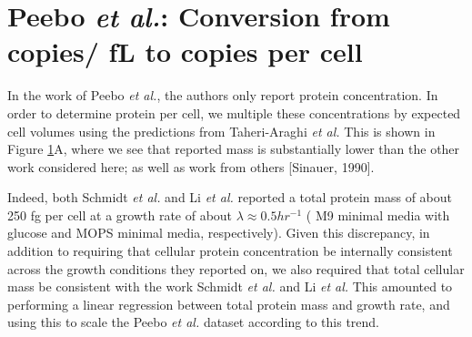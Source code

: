 \section{Peebo {\it et al.}: Conversion from copies/ fL to copies per cell}

In the work of Peebo {\it et al.}, the authors only report protein
concentration. In  order to determine protein per cell, we multiple these
concentrations by expected cell volumes  using the predictions from
Taheri-Araghi {\it et al.} This is shown in Figure \ref{}A, where we see that
reported mass is substantially lower than the other work considered here; as
well as work from others [Sinauer, 1990].

Indeed, both Schmidt {\it et al.} and Li {\it et al.} reported a total protein
mass of about 250 fg per cell at a growth rate of about $\lambda \approx 0.5
hr^{-1}$ ( M9 minimal media with glucose and MOPS minimal media, respectively).
Given this discrepancy, in addition to requiring that cellular protein
concentration be internally consistent across the growth conditions they
reported on, we also required that total cellular mass be consistent with the
work Schmidt {\it et al.} and Li {\it et al.} This amounted to performing a
linear regression between total protein mass and growth rate, and using this to
scale the Peebo {\it et al.} dataset according to this trend.

